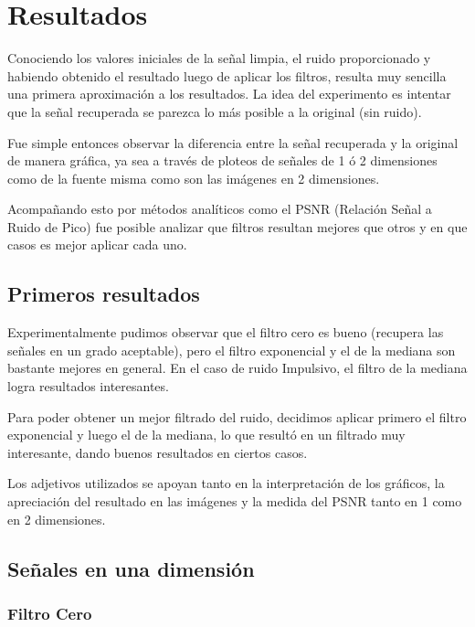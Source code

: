 \section{Resultados}

Conociendo los valores iniciales de la se\~nal limpia, el ruido proporcionado y
habiendo obtenido el resultado luego de aplicar los filtros, resulta muy
sencilla una primera aproximaci\'on a los resultados. La idea del experimento es
intentar que la se\~nal recuperada se parezca lo m\'as posible a la original
(sin ruido).

Fue simple entonces observar la diferencia entre la se\~nal recuperada y
la original de manera gr\'afica, ya sea a trav\'es de ploteos de se\~nales de 1
\'o 2 dimensiones como de la fuente misma como son las im\'agenes en 2
dimensiones.

Acompa\~nando esto por m\'etodos anal\'iticos como el PSNR (Relaci\'on Se\~nal a
Ruido de Pico) fue posible analizar que filtros resultan mejores que otros y en
que casos es mejor aplicar cada uno.

\subsection{Primeros resultados}

Experimentalmente pudimos observar que el filtro cero es bueno (recupera las
se\~nales en un grado aceptable), pero el filtro 
exponencial y el de la mediana son bastante mejores en general. En el caso
de ruido Impulsivo, el filtro de la mediana logra resultados interesantes.

Para poder obtener un mejor filtrado del ruido, decidimos aplicar primero el 
filtro exponencial y luego el de la mediana, lo que result\'o en un filtrado muy 
interesante, dando buenos resultados en ciertos casos. 

Los adjetivos utilizados se apoyan tanto en la interpretaci\'on de los gr\'aficos,
la apreciaci\'on del resultado en las im\'agenes y la medida del PSNR tanto en 1 como en 2
dimensiones. 

\subsection{Se\~nales en una dimensi\'on}

\subsubsection{Filtro Cero}

